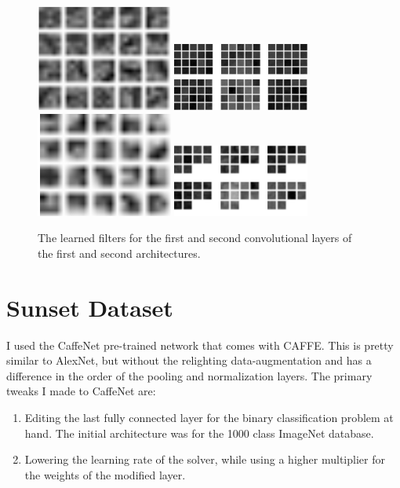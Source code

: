 \documentclass[5pt]{article}
\begin{document}
\begin{figure}[T]
  \centering{}
  \includegraphics[width=0.4\textwidth]{images/mnist_kernels11.png}
  \includegraphics[width=0.4\textwidth]{images/mnist_kernels12.png}
  \includegraphics[width=0.4\textwidth]{images/mnist_kernels21.png}
  \includegraphics[width=0.4\textwidth]{images/mnist_kernels22.png}
  \caption{The learned filters for the first and second convolutional layers of
  the first and second architectures.}
\label{fig:mnist_kernels}
\end{figure}

\section{Sunset Dataset}
I used the CaffeNet pre-trained network that comes with CAFFE\@. This is pretty
similar to AlexNet, but without the relighting data-augmentation and has a
difference in the order of the pooling and normalization layers. The primary
tweaks I made to CaffeNet are:
\begin{enumerate}
  \item Editing the last fully connected layer for the binary classification
    problem at hand. The initial architecture was for the 1000 class ImageNet
    database.
  \item Lowering the learning rate of the solver, while using a higher
    multiplier for the weights of the modified layer.
\end{enumerate}
\end{document}
